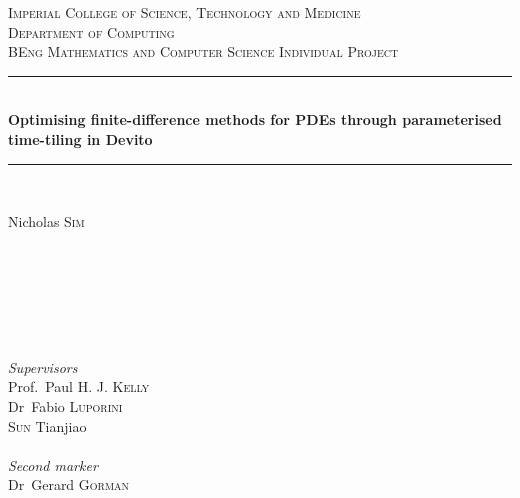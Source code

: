 \begin{titlepage} %
	\newcommand{\HRule}{\rule{\linewidth}{0.5mm}} %

	\centering %


	\textsc{\LARGE Imperial College of Science, Technology and Medicine}\\[1.5cm]

	\textsc{\large Department of Computing}\\[0.5cm] %
	
	\textsc{\large BEng Mathematics and Computer Science Individual Project}\\[0.5cm] %
	
	
	\HRule\\[0.4cm]
	
	{\huge\bfseries Optimising finite-difference methods for PDEs through parameterised time-tiling in Devito}\\[0.15cm] %
	
	\HRule\\[1.5cm]
	
	
	\begin{minipage}{0.4\textwidth}
		\begin{flushleft}
			\large
			Nicholas \textsc{Sim}\\~\\~\\~\\~
		\end{flushleft}
	\end{minipage}
	~
	\begin{minipage}{0.4\textwidth}
		\begin{flushright}
			\large
			\textit{Supervisors}\\
			Prof.~Paul H. J. \textsc{Kelly}\\
			Dr~Fabio \textsc{Luporini}\\
			\textsc{Sun} Tianjiao\\
			~\\
			\textit{Second marker}\\
			Dr~Gerard \textsc{Gorman}
		\end{flushright}
	\end{minipage}


\end{titlepage}
